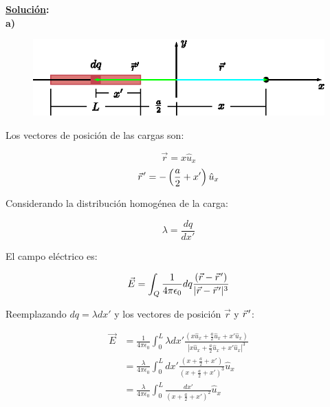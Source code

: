 \documentclass[letter,11pt]{article}
\newcommand{\pvec}[1]{\vec{#1}\mkern2mu\vphantom{#1}}
\begin{document}
\textbf{\underline{Solución}:} \\

\textbf{a)}
\begin{figure}[!h]
\centering
\includegraphics[scale=1.50]{resources/f2.eps}
\end{figure}
\vspace{0.20cm}

Los vectores de posición de las cargas son:

\begin{equation*}
    \vec{r} = x\hat{u}_x
\end{equation*}
\begin{equation*}
    \pvec{r}' = -\left(\frac{a}{2}+x'\right)\hat{u}_x
\end{equation*}
\vspace{0.20cm}

Considerando la distribución homogénea de la carga:

\begin{equation*}
    \lambda = \frac{dq}{dx'}
\end{equation*}
\vspace{0.20cm}

El campo eléctrico es:

\begin{equation*}
    \vec{E} = \int_Q\frac{1}{4\pi\epsilon_0}dq
              \frac{(\vec{r}-\pvec{r}')}{|\vec{r}-\pvec{r}'|^3}
\end{equation*}
\vspace{0.20cm}

Reemplazando $dq=\lambda dx'$ y los vectores de posición $\vec{r}$ y
$\pvec{r}'$:

\begin{equation*}
\begin{split}
    \vec{E} &= \frac{1}{4\pi\epsilon_0}\int_0^L\lambda dx'
               \frac{(x\hat{u}_x+\frac{a}{2}\hat{u}_x+x'\hat{u}_x)}
               {|x\hat{u}_x+\frac{a}{2}\hat{u}_x+x'\hat{u}_x|^3}\\
            &= \frac{\lambda}{4\pi\epsilon_0}\int_0^L dx'
               \frac{(x+\frac{a}{2}+x')}{(x+\frac{a}{2}+x')^3}
               \hat{u}_x\\
            &= \frac{\lambda}{4\pi\epsilon_0}\int_0^L
               \frac{dx'}{(x+\frac{a}{2}+x')^2}\hat{u}_x
\end{split}
\end{equation*}
\vspace{0.20cm}
\end{document}
